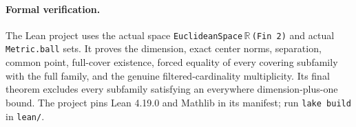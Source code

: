 \documentclass[11pt]{article}
\begin{document}
\paragraph{Formal verification.}
The Lean project uses the actual space \texttt{EuclideanSpace}\,$\mathbb R$\,\texttt{(Fin 2)} and actual \texttt{Metric.ball} sets. It proves the dimension, exact center norms, separation, common point, full-cover existence, forced equality of every covering subfamily with the full family, and the genuine filtered-cardinality multiplicity. Its final theorem excludes every subfamily satisfying an everywhere dimension-plus-one bound. The project pins Lean 4.19.0 and Mathlib in its manifest; run \texttt{lake build} in \texttt{lean/}.
\end{document}
